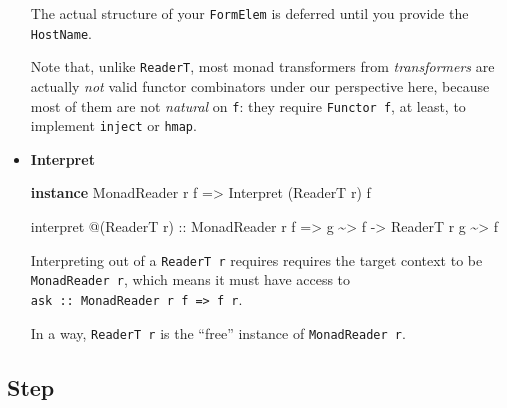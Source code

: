 \documentclass[]{article}
\newenvironment{Shaded}{}{}
\newcommand{\DataTypeTok}[1]{\textcolor[rgb]{0.56,0.13,0.00}{#1}}
\newcommand{\KeywordTok}[1]{\textcolor[rgb]{0.00,0.44,0.13}{\textbf{#1}}}
\newcommand{\NormalTok}[1]{#1}
\newcommand{\OperatorTok}[1]{\textcolor[rgb]{0.40,0.40,0.40}{#1}}
\newcommand{\OtherTok}[1]{\textcolor[rgb]{0.00,0.44,0.13}{#1}}
\begin{document}
\begin{itemize}
  The actual structure of your \texttt{FormElem} is deferred until you provide
  the \texttt{HostName}.

  Note that, unlike \texttt{ReaderT}, most monad transformers from
  \emph{transformers} are actually \emph{not} valid functor combinators under
  our perspective here, because most of them are not \emph{natural} on
  \texttt{f}: they require \texttt{Functor\ f}, at least, to implement
  \texttt{inject} or \texttt{hmap}.
\item
  \textbf{Interpret}

\begin{Shaded}
\begin{Highlighting}[]
\KeywordTok{instance} \DataTypeTok{MonadReader}\NormalTok{ r f }\OtherTok{=>} \DataTypeTok{Interpret}\NormalTok{ (}\DataTypeTok{ReaderT}\NormalTok{ r) f}

\NormalTok{interpret }\OperatorTok{@}\NormalTok{(}\DataTypeTok{ReaderT}\NormalTok{ r)}
\OtherTok{    ::} \DataTypeTok{MonadReader}\NormalTok{ r f}
    \OtherTok{=>}\NormalTok{ g }\OperatorTok{\textasciitilde{}>}\NormalTok{ f}
    \OtherTok{{-}>} \DataTypeTok{ReaderT}\NormalTok{ r g }\OperatorTok{\textasciitilde{}>}\NormalTok{ f}
\end{Highlighting}
\end{Shaded}

  Interpreting out of a \texttt{ReaderT\ r} requires requires the target context
  to be \texttt{MonadReader\ r}, which means it must have access to
  \texttt{ask\ ::\ MonadReader\ r\ f\ =\textgreater{}\ f\ r}.

  In a way, \texttt{ReaderT\ r} is the ``free'' instance of
  \texttt{MonadReader\ r}.
\end{itemize}

\hypertarget{step}{%
\subsection{Step}\label{step}}
\end{document}
